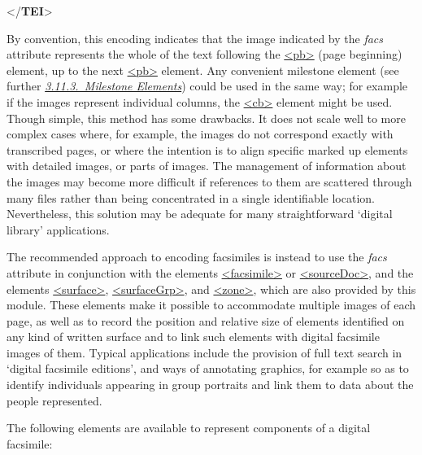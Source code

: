 \begin{shaded}
{</\textbf{TEI}>}\end{shaded}\egroup\par \noindent  By convention, this encoding indicates that the image indicated by the {\itshape facs} attribute represents the whole of the text following the \hyperref[TEI.pb]{<pb>} (page beginning) element, up to the next \hyperref[TEI.pb]{<pb>} element. Any convenient milestone element (see further \textit{\hyperref[CORS5]{3.11.3.\ Milestone Elements}}) could be used in the same way; for example if the images represent individual columns, the \hyperref[TEI.cb]{<cb>} element might be used. Though simple, this method has some drawbacks. It does not scale well to more complex cases where, for example, the images do not correspond exactly with transcribed pages, or where the intention is to align specific marked up elements with detailed images, or parts of images. The management of information about the images may become more difficult if references to them are scattered through many files rather than being concentrated in a single identifiable location. Nevertheless, this solution may be adequate for many straightforward ‘digital library’ applications.\par
The recommended approach to encoding facsimiles is instead to use the {\itshape facs} attribute in conjunction with the elements \hyperref[TEI.facsimile]{<facsimile>} or \hyperref[TEI.sourceDoc]{<sourceDoc>}, and the elements \hyperref[TEI.surface]{<surface>}, \hyperref[TEI.surfaceGrp]{<surfaceGrp>}, and \hyperref[TEI.zone]{<zone>}, which are also provided by this module. These elements make it possible to accommodate multiple images of each page, as well as to record the position and relative size of elements identified on any kind of written surface and to link such elements with digital facsimile images of them. Typical applications include the provision of full text search in ‘digital facsimile editions’, and ways of annotating graphics, for example so as to identify individuals appearing in group portraits and link them to data about the people represented.\par
The following elements are available to represent components of a digital facsimile: 
